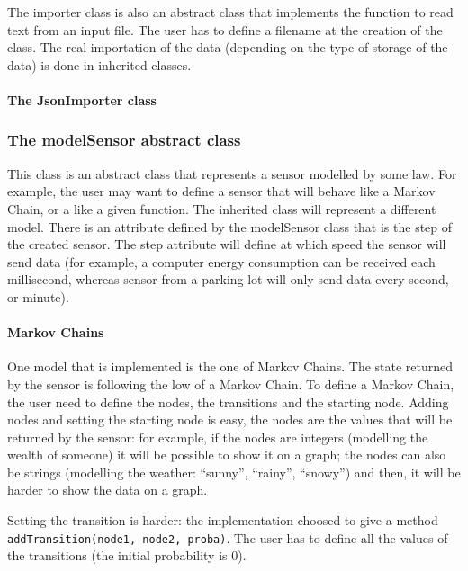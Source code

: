 The importer class is also an abstract class that implements the function
to read text from an input file. The user has to define a filename at the
creation of the class. The real importation of the data (depending on the type
of storage of the data) is done in inherited classes.

\paragraph{The JsonImporter class}




\subsubsection{The modelSensor abstract class}

This class is an abstract class that represents a sensor modelled by some
law. For example, the user may want to define a sensor that will behave like a
Markov Chain, or a like a given function. The inherited class will represent a
different model. There is an attribute defined by the modelSensor class that is
the step of the created sensor. The step attribute will define at which speed
the sensor will send data (for example, a computer energy consumption can be
received each millisecond, whereas sensor from a parking lot will only send
data every second, or minute).

\paragraph{Markov Chains}

One model that is implemented is the one of Markov Chains. The state returned
by the sensor is following the low of a Markov Chain. To define a Markov
Chain, the user need to define the nodes, the transitions and the starting
node. Adding nodes and setting the starting node is easy, the nodes are the
values that will be returned by the sensor: for example, if the nodes are
integers (modelling the wealth of someone) it will be possible to show it
on a graph; the nodes can also be strings (modelling the weather: ``sunny'',
``rainy'', ``snowy'') and then, it will be harder to show the data on a graph.

Setting the transition is harder: the implementation choosed to give a method
\verb!addTransition(node1, node2, proba)!. The user has to define all the
values of the transitions (the initial probability is 0).

